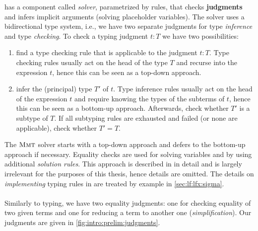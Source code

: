 \mmt has a component called \emph{solver}, parametrized by rules, that checks \textbf{judgments} and infers implicit arguments (solving placeholder variables). The solver uses a bidirectional type system, i.e., we have two separate judgments for type \emph{inference} and type \emph{checking}. To check a typing judgment $t:T$ we have two possibilities:
\begin{enumerate}
	\item find a type checking rule that is applicable to the judgment $t : T$. Type checking rules usually act on the head of the type $T$ and recurse into the expression $t$, hence this can be seen as a top-down approach.
	\item infer the (principal) type $T'$ of $t$. Type inference rules usually act on the head of the expression $t$ and require knowing the types of the subterms of $t$, hence this can be seen as a bottom-up approach. Afterwards, check whether $T'$ is a subtype of $T$. If all subtyping rules are exhausted and failed (or none are applicable), check whether $T'=T$.
\end{enumerate}
The $\textsc{Mmt}$ solver starts with a top-down approach and defers to the bottom-up approach if necessary. Equality checks are used for solving variables and by using additional \emph{solution rules}. This approach is described in \cite{rabe:recon:17} in detail and is largely irrelevant for the purposes of this thesis, hence details are omitted. The details on \emph{implementing} typing rules in \mmt are treated by example in \autoref{sec:lf:lfx:sigma}.


\paragraph{} Similarly to typing, we have two equality judgments: one for checking equality of two given terms and one for reducing a term to another one (\emph{simplification}).
\hypertarget{judg}{Our judgments are given in \autoref{fig:intro:prelim:judgments}}.



